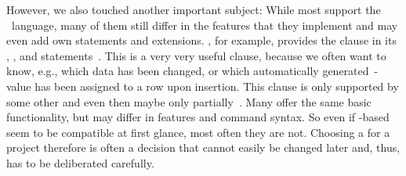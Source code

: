 However, we also touched another important subject:
While most  support the \sql\ language, many of them still differ in the features that they implement and may even add own statements and extensions.
\postgresql, for example, provides the  clause in its , , and  statements~\cite{SE:DA:2020WDSSOAOTNPSDIOR}.
This is a very very useful clause, because we often want to know, e.g., which data has been changed, or which automatically generated~\nobreakdashes-value has been assigned to a row upon insertion.
This clause is only supported by some other  and even then maybe only partially~\cite{HWACIS:R,M:MSD:D,M:MSD:IR}.
Many  offer the same basic functionality, but may differ in features and command syntax.
So even if \sql-based  seem to be compatible at first glance, most often they are not.
Choosing a  for a project therefore is often a decision that cannot easily be changed later and, thus, has to be deliberated carefully.%
\endhsection%
\FloatBarrier%
\endhsection%
%
